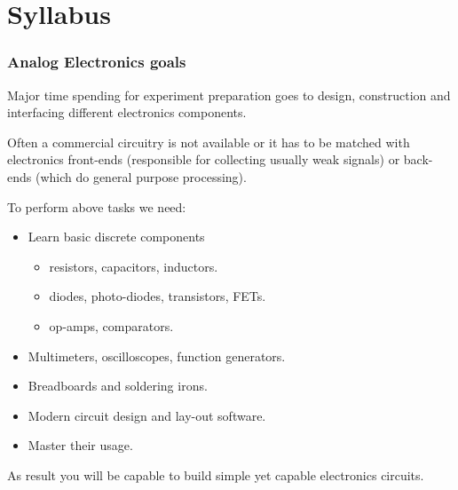 \documentclass[beamer]{standalone}
\begin{document}
\section{Syllabus}
\begin{frame}
\frametitle{Analog Electronics goals}
 Major time spending for experiment preparation goes to design,
 construction and interfacing  different electronics components.
 
 Often a commercial circuitry is not available or it has to be matched
 with electronics front-ends (responsible for collecting usually weak
 signals)  or back-ends (which do general purpose processing).

 To perform above tasks we need:
 \begin{itemize}
  \item Learn basic discrete components
  \begin{itemize}
   \item resistors, capacitors, inductors.
   \item diodes, photo-diodes, transistors, FETs.
   \item op-amps, comparators.
  \end{itemize}
  \item Multimeters, oscilloscopes, function generators.
  \item Breadboards and soldering irons.
  \item Modern circuit design and lay-out software.
  \item Master their usage.
 \end{itemize}
 As result you will be capable to build simple yet capable electronics circuits.
\end{frame}
\end{document}
